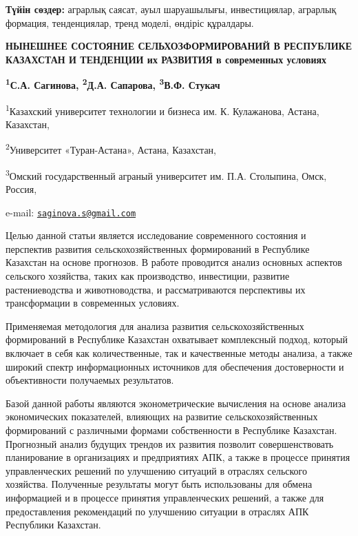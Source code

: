 {\bfseries Түйін сөздер:} аграрлық саясат, ауыл шаруашылығы, инвестициялар,
аграрлық формация, тенденциялар, тренд моделі, өндіріс құралдары.
\begin{articleheader}

{\bfseries НЫНЕШНЕЕ  СОСТОЯНИЕ СЕЛЬХОЗФОРМИРОВАНИЙ В РЕСПУБЛИКЕ КАЗАХСТАН И
ТЕНДЕНЦИИ их РАЗВИТИЯ в современных условиях}

{\bfseries \textsuperscript{1}С.А. Сагинова\textsuperscript{\envelope },
\textsuperscript{2}Д.А. Сапарова, \textsuperscript{3}В.Ф. Стукач}
\end{articleheader}
\begin{affiliation}

\textsuperscript{1}Казахский университет технологии и бизнеса им. К.
Кулажанова, Астана, Казахстан,

\textsuperscript{2}Университет «Туран-Астана», Астана, Казахстан,

\textsuperscript{3}Омский государственный аграный университет им. П.А.
Столыпина, Омск, Россия,

e-mail: \href{mailto:saginova.s@gmail.com}{\nolinkurl{saginova.s@gmail.com}}
\end{affiliation}

Целью данной статьи является исследование современного состояния и
перспектив развития сельскохозяйственных формирований в Республике
Казахстан на основе прогнозов. В работе проводится анализ основных
аспектов сельского хозяйства, таких как производство, инвестиции,
развитие растениеводства и животноводства, и рассматриваются перспективы
их трансформации в современных условиях.

Применяемая методология для анализа развития сельскохозяйственных
формирований в Республике Казахстан охватывает комплексный подход,
который включает в себя как количественные, так и качественные методы
анализа, а также широкий спектр информационных источников для
обеспечения достоверности и объективности получаемых результатов.

Базой данной работы являются эконометрические вычисления на основе
анализа экономических показателей, влияющих на развитие
сельскохозяйственных формирований с различными формами собственности в
Республике Казахстан. Прогнозный анализ будущих трендов их развития
позволит совершенствовать планирование в организациях и предприятиях
АПК, а также в процессе принятия управленческих решений по улучшению
ситуаций в отраслях сельского хозяйства. Полученные результаты могут
быть использованы для обмена информацией и в процессе принятия
управленческих решений, а также для предоставления рекомендаций по
улучшению ситуации в отраслях АПК Республики Казахстан.

